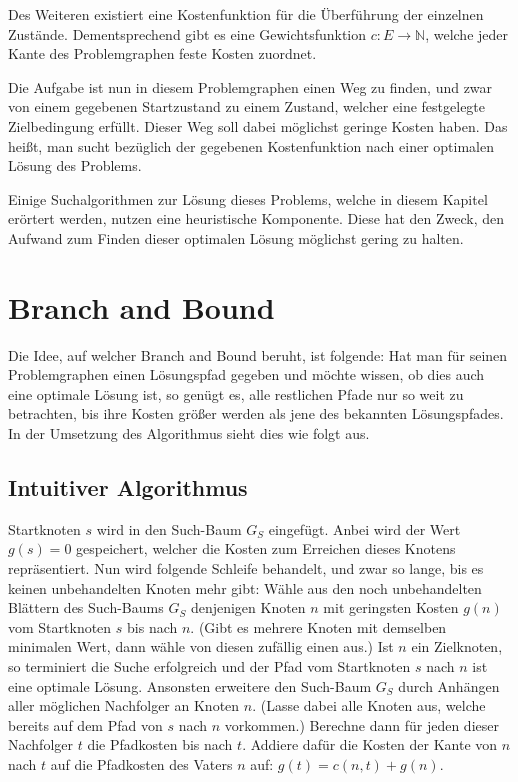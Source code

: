 Des Weiteren existiert eine Kostenfunktion für die Überführung der einzelnen Zustände. Dementsprechend gibt es eine Gewichtsfunktion $c:E\to \mathbb{N}$, welche jeder Kante des Problemgraphen feste Kosten zuordnet.

Die Aufgabe ist nun in diesem Problemgraphen einen Weg zu finden, und zwar von einem gegebenen Startzustand zu einem Zustand, welcher eine festgelegte Zielbedingung erfüllt.
Dieser Weg soll dabei möglichst geringe Kosten haben. Das heißt, man sucht bezüglich der gegebenen Kostenfunktion nach einer optimalen Lösung des Problems.

Einige Suchalgorithmen zur Lösung dieses Problems, welche in diesem Kapitel erörtert werden, nutzen eine heuristische Komponente.
Diese hat den Zweck, den Aufwand zum Finden dieser optimalen Lösung möglichst gering zu halten.




\section{Branch and Bound}

Die Idee, auf welcher Branch and Bound beruht, ist folgende: Hat man für seinen Problemgraphen einen Lösungspfad gegeben und möchte wissen, ob dies auch eine optimale Lösung ist, so genügt es, alle restlichen Pfade nur so weit zu betrachten, bis ihre Kosten größer werden als jene des bekannten Lösungspfades.
In der Umsetzung des Algorithmus sieht dies wie folgt aus.

\subsection{Intuitiver Algorithmus}

Startknoten $s$ wird in den Such-Baum $G_{S}$ eingefügt. Anbei wird der Wert $g(s)=0$ gespeichert, welcher die Kosten zum Erreichen dieses Knotens repräsentiert.
Nun wird folgende Schleife behandelt, und zwar so lange, bis es keinen unbehandelten Knoten mehr gibt:
Wähle aus den noch unbehandelten Blättern des Such-Baums $G_{S}$ denjenigen Knoten $n$ mit geringsten Kosten $g(n)$ vom Startknoten $s$ bis nach $n$. (Gibt es mehrere Knoten mit demselben minimalen Wert, dann wähle von diesen zufällig einen aus.)
Ist $n$ ein Zielknoten, so terminiert die Suche erfolgreich und der Pfad vom Startknoten $s$ nach $n$ ist eine optimale Lösung.
Ansonsten erweitere den Such-Baum $G_{S}$ durch Anhängen aller möglichen Nachfolger an Knoten $n$. (Lasse dabei alle Knoten aus, welche bereits auf dem Pfad von $s$ nach $n$ vorkommen.) Berechne dann für jeden dieser Nachfolger $t$ die Pfadkosten bis nach $t$. Addiere dafür die Kosten der Kante von $n$ nach $t$ auf die Pfadkosten des Vaters $n$ auf: $g(t)=c({n,t})+g(n)$.

